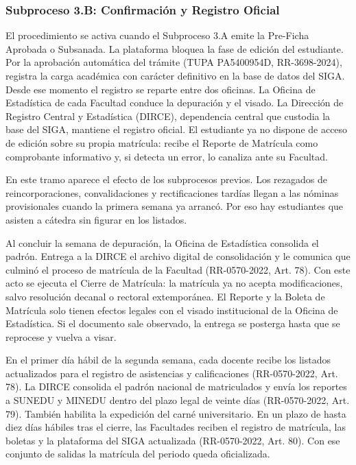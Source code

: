 \subsubsection{Subproceso 3.B: Confirmaci\'on y Registro Oficial}

El procedimiento se activa cuando el Subproceso 3.A emite la Pre-Ficha Aprobada o Subsanada. La plataforma bloquea la fase de edici\'on del estudiante. Por la aprobaci\'on autom\'atica del tr\'amite (TUPA PA5400954D, RR-3698-2024), registra la carga acad\'emica con car\'acter definitivo en la base de datos del SIGA. Desde ese momento el registro se reparte entre dos oficinas. La Oficina de Estad\'istica de cada Facultad conduce la depuraci\'on y el visado. La Direcci\'on de Registro Central y Estad\'istica (DIRCE), dependencia central que custodia la base del SIGA, mantiene el registro oficial. El estudiante ya no dispone de acceso de edici\'on sobre su propia matr\'icula: recibe el Reporte de Matr\'icula como comprobante informativo y, si detecta un error, lo canaliza ante su Facultad.

En este tramo aparece el efecto de los subprocesos previos. Los rezagados de reincorporaciones, convalidaciones y rectificaciones tard\'ias llegan a las n\'ominas provisionales cuando la primera semana ya arranc\'o. Por eso hay estudiantes que asisten a c\'atedra sin figurar en los listados.

Al concluir la semana de depuraci\'on, la Oficina de Estad\'istica consolida el padr\'on. Entrega a la DIRCE el archivo digital de consolidaci\'on y le comunica que culmin\'o el proceso de matr\'icula de la Facultad (RR-0570-2022, Art. 78\textdegree{}). Con este acto se ejecuta el Cierre de Matr\'icula: la matr\'icula ya no acepta modificaciones, salvo resoluci\'on decanal o rectoral extempor\'anea. El Reporte y la Boleta de Matr\'icula solo tienen efectos legales con el visado institucional de la Oficina de Estad\'istica. Si el documento sale observado, la entrega se posterga hasta que se reprocese y vuelva a visar.

En el primer d\'ia h\'abil de la segunda semana, cada docente recibe los listados actualizados para el registro de asistencias y calificaciones (RR-0570-2022, Art. 78\textdegree{}). La DIRCE consolida el padr\'on nacional de matriculados y env\'ia los reportes a SUNEDU y MINEDU dentro del plazo legal de veinte d\'ias (RR-0570-2022, Art. 79\textdegree{}). Tambi\'en habilita la expedici\'on del carn\'e universitario. En un plazo de hasta diez d\'ias h\'abiles tras el cierre, las Facultades reciben el registro de matr\'icula, las boletas y la plataforma del SIGA actualizada (RR-0570-2022, Art. 80\textdegree{}). Con ese conjunto de salidas la matr\'icula del periodo queda oficializada.

